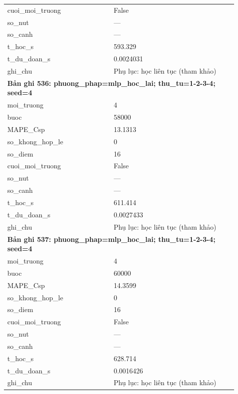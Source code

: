 \begin{longtable}{p{0.43\linewidth}p{0.50\linewidth}}
cuoi\_\allowbreak moi\_\allowbreak truong & False \\
so\_\allowbreak nut & — \\
so\_\allowbreak canh & — \\
t\_\allowbreak hoc\_\allowbreak s & 593.329 \\
t\_\allowbreak du\_\allowbreak doan\_\allowbreak s & 0.0024031 \\
ghi\_\allowbreak chu & Phụ lục: học liên tục (tham khảo) \\
\midrule
\multicolumn{2}{p{0.95\linewidth}}{\textbf{Bản ghi 536: phuong\_phap=mlp\_hoc\_lai; thu\_tu=1-2-3-4; seed=4}} \\
moi\_\allowbreak truong & 4 \\
buoc & 58000 \\
MAPE\_\allowbreak Csp & 13.1313 \\
so\_\allowbreak khong\_\allowbreak hop\_\allowbreak le & 0 \\
so\_\allowbreak diem & 16 \\
cuoi\_\allowbreak moi\_\allowbreak truong & False \\
so\_\allowbreak nut & — \\
so\_\allowbreak canh & — \\
t\_\allowbreak hoc\_\allowbreak s & 611.414 \\
t\_\allowbreak du\_\allowbreak doan\_\allowbreak s & 0.0027433 \\
ghi\_\allowbreak chu & Phụ lục: học liên tục (tham khảo) \\
\midrule
\multicolumn{2}{p{0.95\linewidth}}{\textbf{Bản ghi 537: phuong\_phap=mlp\_hoc\_lai; thu\_tu=1-2-3-4; seed=4}} \\
moi\_\allowbreak truong & 4 \\
buoc & 60000 \\
MAPE\_\allowbreak Csp & 14.3599 \\
so\_\allowbreak khong\_\allowbreak hop\_\allowbreak le & 0 \\
so\_\allowbreak diem & 16 \\
cuoi\_\allowbreak moi\_\allowbreak truong & False \\
so\_\allowbreak nut & — \\
so\_\allowbreak canh & — \\
t\_\allowbreak hoc\_\allowbreak s & 628.714 \\
t\_\allowbreak du\_\allowbreak doan\_\allowbreak s & 0.0016426 \\
ghi\_\allowbreak chu & Phụ lục: học liên tục (tham khảo) \\

\end{longtable}
